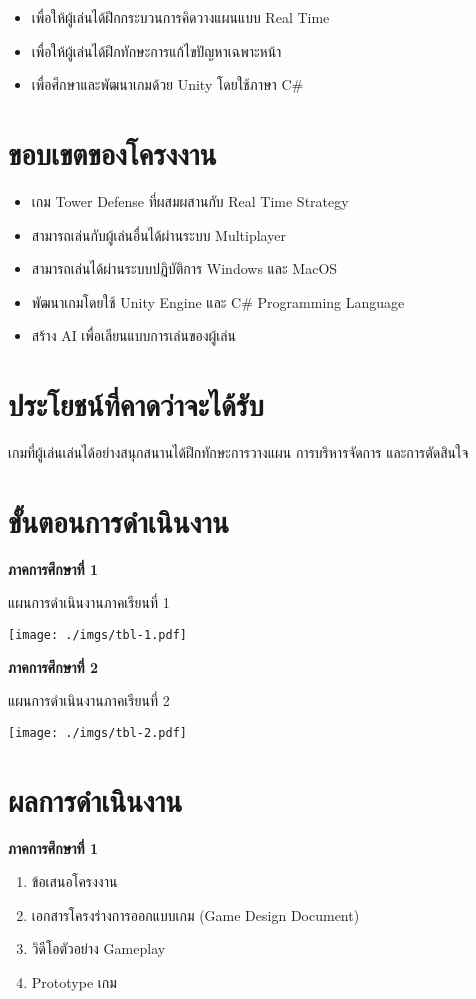 \documentclass[12pt,oneside,openright,a4paper]{cpe-thai-project}
\begin{document}
\begin{itemize}
\item เพื่อให้ผู้เล่นได้ฝึกกระบวนการคิดวางแผนแบบ Real Time 
\item เพื่อให้ผู้เล่นได้ฝึกทักษะการแก้ไขปัญหาเฉพาะหน้า
\item เพื่อศึกษาและพัฒนาเกมด้วย Unity โดยใช้ภาษา C\#
\end{itemize}


\section{ขอบเขตของโครงงาน}

\begin{itemize}
\item  เกม Tower Defense ที่ผสมผสานกับ Real Time Strategy
\item  สามารถเล่นกับผู้เล่นอื่นได้ผ่านระบบ Multiplayer 
\item  สามารถเล่นได้ผ่านระบบปฏิบัติการ Windows และ MacOS
\item  พัฒนาเกมโดยใช้ Unity Engine และ C\# Programming Language 
\item  สร้าง AI เพื่อเลียนแบบการเล่นของผู้เล่น 
\end{itemize}


\section{ประโยชน์ที่คาดว่าจะได้รับ}

เกมที่ผู้เล่นเล่นได้อย่างสนุกสนานได้ฝึกทักษะการวางแผน การบริหารจัดการ และการตัดสินใจ

\pagebreak
\section{ขั้นตอนการดำเนินงาน}
\textbf{ภาคการศึกษาที่ 1}
\begin{table}[H]
  \caption{แผนการดำเนินงานภาคเรียนที่ 1}\label{tbl:tab-1}
  \texttt{[image: ./imgs/tbl-1.pdf]}
\end{table}

\textbf{ภาคการศึกษาที่ 2}
\begin{table}[H]
  \caption{แผนการดำเนินงานภาคเรียนที่ 2}\label{tbl:tab-2}
  \texttt{[image: ./imgs/tbl-2.pdf]}
\end{table}

\pagebreak
\section{ผลการดำเนินงาน}
\textbf{ภาคการศึกษาที่ 1}
\begin{enumerate}
  \item ข้อเสนอโครงงาน
  \item เอกสารโครงร่างการออกแบบเกม (Game Design Document) 
  \item วิดีโอตัวอย่าง Gameplay
  \item Prototype เกม
  
\end{enumerate}
\end{document}
